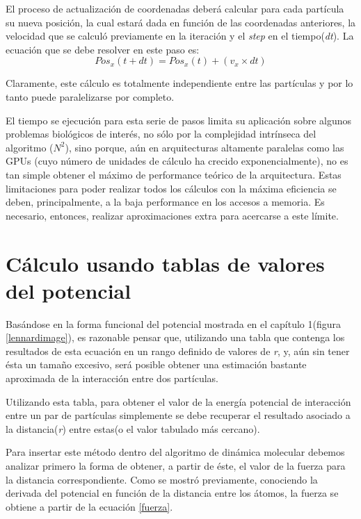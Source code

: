 El proceso de actualización de coordenadas deberá calcular para cada partícula su nueva posición, la cual estará dada en función de las coordenadas anteriores, la velocidad que se calculó previamente en la iteración y el \textit{step} en el tiempo(\textit{dt}). 
La ecuación que se debe resolver en este paso es:
\begin{equation} 
    Pos_x(t+dt)= Pos_x(t) + (v_x \times dt)
\end{equation}

Claramente, este cálculo es totalmente independiente entre las partículas y por lo tanto puede paralelizarse por completo.

El tiempo se ejecución para esta serie de pasos limita su aplicación sobre algunos problemas biológicos de interés, no sólo por la complejidad intrínseca del algoritmo ($N^2$), sino porque, aún en arquitecturas altamente paralelas como
las GPUs (cuyo número de unidades de cálculo ha crecido exponencialmente), no es tan simple obtener el máximo de performance teórico de la arquitectura. 
Estas limitaciones para poder realizar todos los cálculos con la máxima eficiencia se deben, principalmente, a la baja performance en los accesos a memoria. 
Es necesario, entonces, realizar aproximaciones extra para acercarse a este límite.


\section{Cálculo usando tablas de valores del potencial }


Basándose en la forma funcional del potencial mostrada en el capítulo 1(figura \ref{lennardimage}), es razonable pensar que, utilizando una tabla que contenga los resultados de esta ecuación en un rango definido de valores de \textit{r}, y, 
aún sin tener ésta un tamaño excesivo, será posible obtener una estimación bastante aproximada de la interacción entre dos partículas. 

Utilizando esta tabla, para obtener el valor de la energía potencial de interacción entre un par de partículas simplemente se debe recuperar el resultado asociado a la distancia(\textit{r}) entre estas(o el valor tabulado más cercano).


Para insertar este método dentro del algoritmo de dinámica molecular debemos analizar primero la forma de obtener, a partir de éste, el valor de la fuerza para la distancia correspondiente.
Como se mostró previamente, conociendo la derivada del potencial en función de la distancia entre los átomos, la fuerza se obtiene a partir de la ecuación \ref{fuerza}.

